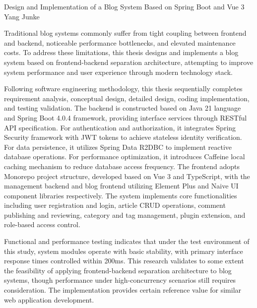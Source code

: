 \documentclass[UTF8,AutoFakeBold=1,AutoFakeSlant,zihao=-4]{SCAU}
\begin{document}
\begin{abstractEN}
{Design and Implementation of a Blog System Based on Spring Boot and Vue 3}  %
{Yang Junke}  %
{Traditional blog systems commonly suffer from tight coupling between frontend and backend, noticeable performance bottlenecks, and elevated maintenance costs. To address these limitations, this thesis designs and implements a blog system based on frontend-backend separation architecture, attempting to improve system performance and user experience through modern technology stack.

Following software engineering methodology, this thesis sequentially completes requirement analysis, conceptual design, detailed design, coding implementation, and testing validation. The backend is constructed based on Java 21 language and Spring Boot 4.0.4 framework, providing interface services through RESTful API specification. For authentication and authorization, it integrates Spring Security framework with JWT tokens to achieve stateless identity verification. For data persistence, it utilizes Spring Data R2DBC to implement reactive database operations. For performance optimization, it introduces Caffeine local caching mechanism to reduce database access frequency. The frontend adopts Monorepo project structure, developed based on Vue 3 and TypeScript, with the management backend and blog frontend utilizing Element Plus and Naive UI component libraries respectively. The system implements core functionalities including user registration and login, article CRUD operations, comment publishing and reviewing, category and tag management, plugin extension, and role-based access control.

Functional and performance testing indicates that under the test environment of this study, system modules operate with basic stability, with primary interface response times controlled within 200ms. This research validates to some extent the feasibility of applying frontend-backend separation architecture to blog systems, though performance under high-concurrency scenarios still requires consideration. The implementation provides certain reference value for similar web application development.}  %
\end{abstractEN}

\contentpage
\end{document}
